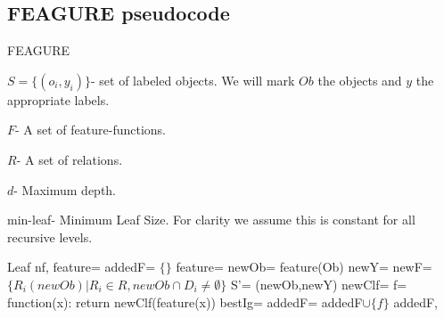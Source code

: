 \documentclass[twoside,11pt]{article}
\theoremstyle{definition}
\begin{document}
\begin{appendices}
	\section{FEAGURE pseudocode} \label{app:2}
	
	\begin{algorithm}[H]
		\caption{FEAGURE}
		\label{code2}
		\small
		$S=\{(o_{i},y_{i})\}$- set of labeled objects. We will mark $Ob$ the objects and $y$ the appropriate labels.
		
		$F$- A set of feature-functions.
		
		$R$- A set of relations.
		
		$d$- Maximum depth.
		
		min-leaf- Minimum Leaf Size. For clarity we assume this is constant for all recursive levels.
		
		\begin{algorithmic}
					\State
					\Return Leaf
				\EndIf
				\State nf, feature= 
				\State {}
				\State
				\Return {}
			\EndFunction
				\State
				\Return {}
			\EndIf
			\State addedF= $\{\}$
				\State feature= 
				\State newOb= feature(Ob)
				\State newY= 
				\State newF= $\{R_{i}(newOb)|R_{i}\in R, newOb\cap D_{i}\neq\emptyset\}$
				\State S'= (newOb,newY)
				\State newClf= 
				\State f= function(x): return newClf(feature(x))
				\State bestIg= 
					\State addedF= addedF$\cup \{f\}$
				\EndIf
			\EndWhile
			\State
			\Return addedF, 
			\EndFunction
			
		\end{algorithmic}
	\end{algorithm}
	
\end{appendices}

\vskip 0.2in


%
%
\end{document}
